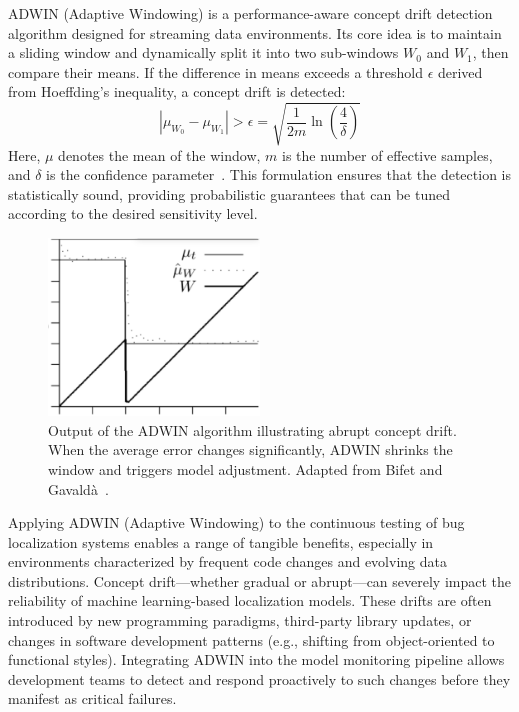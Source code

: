 \documentclass[manuscript,screen,review]{acmart}
\begin{document}
ADWIN (Adaptive Windowing) is a performance-aware concept drift detection algorithm designed for streaming data environments. Its core idea is to maintain a sliding window and dynamically split it into two sub-windows \( W_0 \) and \( W_1 \), then compare their means. If the difference in means exceeds a threshold \( \epsilon \) derived from Hoeffding’s inequality, a concept drift is detected:
\[
\left| \mu_{W_0} - \mu_{W_1} \right| > \epsilon = \sqrt{ \frac{1}{2m} \ln \left( \frac{4}{\delta} \right) }
\]
Here, \( \mu \) denotes the mean of the window, \( m \) is the number of effective samples, and \( \delta \) is the confidence parameter~\cite{Bifet2007}.
This formulation ensures that the detection is statistically sound, providing probabilistic guarantees that can be tuned according to the desired sensitivity level.

\begin{figure}[H]
  \centering
  \includegraphics[width=0.5\textwidth]{picture/5.1fig2.pdf}
  \caption{Output of the ADWIN algorithm illustrating abrupt concept drift. When the average error changes significantly, ADWIN shrinks the window and triggers model adjustment. Adapted from Bifet and Gavaldà~\cite{Bifet2007}.}
  \label{fig:adwin}
\end{figure}

Applying ADWIN (Adaptive Windowing) to the continuous testing of bug localization systems enables a range of tangible benefits, especially in environments characterized by frequent code changes and evolving data distributions. Concept drift---whether gradual or abrupt---can severely impact the reliability of machine learning-based localization models. These drifts are often introduced by new programming paradigms, third-party library updates, or changes in software development patterns (e.g., shifting from object-oriented to functional styles). Integrating ADWIN into the model monitoring pipeline allows development teams to detect and respond proactively to such changes before they manifest as critical failures.
\end{document}
